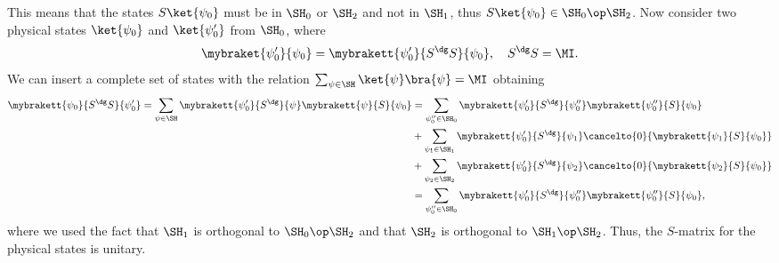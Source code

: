 This means that the states $S\ket{\psi_0}$ must be in $\SH_0$ or $\SH_2$ and not in $\SH_1$, thus $S\ket{\psi_0} \in \SH_0 \op \SH_2$. Now consider two physical states $\ket{\psi_0}$ and $\ket{\psi_0'}$ from $\SH_0$, where
\begin{equation}
    \mybraket{\psi_0'}{\psi_0} = \mybrakett{\psi_0'}{S^\dg S}{\psi_0},\quad S^\dg S = \MI.
\end{equation}
We can insert a complete set of states with the relation $\sum_{\psi \in \SH}\ket{\psi}\bra{\psi} = \MI$ obtaining
\begin{equation}
    \begin{split}
        \mybrakett{\psi_0}{S^\dg S}{\psi_0'} = \sum_{\psi \in \SH}\mybrakett{\psi_0'}{S^\dg}{\psi}\mybrakett{\psi}{S}{\psi_0} &= \sum_{\psi_0'' \in \SH_0}\mybrakett{\psi_0'}{S^\dg}{\psi_0''}\mybrakett{\psi_0''}{S}{\psi_0} \\
        &+ \sum_{\psi_1 \in \SH_1}\mybrakett{\psi_0'}{S^\dg}{\psi_1}\cancelto{0}{\mybrakett{\psi_1}{S}{\psi_0}} \\
        &+ \sum_{\psi_2 \in \SH_2}\mybrakett{\psi_0'}{S^\dg}{\psi_2}\cancelto{0}{\mybrakett{\psi_2}{S}{\psi_0}} \\
        &= \sum_{\psi_0'' \in \SH_0}\mybrakett{\psi_0'}{S^\dg}{\psi_0''}\mybrakett{\psi_0''}{S}{\psi_0},
    \end{split}
\end{equation}
where we used the fact that $\SH_1$ is orthogonal to $\SH_0 \op \SH_2$ and that $\SH_2$ is orthogonal to $\SH_1 \op \SH_2$. Thus, the $S$-matrix for the physical states is unitary.

